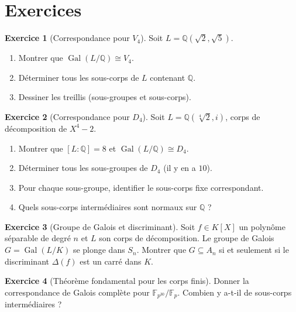\documentclass[12pt,a4paper,openany]{book}
\theoremstyle{definition}
\newtheorem{exercice}{Exercice}[chapter]
\newcommand{\Q}{\mathbb{Q}}
\newcommand{\F}{\mathbb{F}}
\newcommand{\Gal}{\operatorname{Gal}}
\begin{document}
\section{Exercices}\label{sec:exercices-chap12}

\begin{exercice}[Correspondance pour $V_4$]\label{exo:correspondance-V4}
Soit $L = \Q(\sqrt{2},\sqrt{5})$.
\begin{enumerate}[label=(\alph*)]
  \item Montrer que $\Gal(L/\Q) \cong V_4$.
  \item Déterminer tous les sous-corps de $L$ contenant $\Q$.
  \item Dessiner les treillis (sous-groupes et sous-corps).
\end{enumerate}
\end{exercice}

\begin{exercice}[Correspondance pour $D_4$]\label{exo:correspondance-D4}
Soit $L = \Q(\sqrt[4]{2}, i)$, corps de décomposition de $X^4 - 2$.
\begin{enumerate}[label=(\alph*)]
  \item Montrer que $[L:\Q] = 8$ et $\Gal(L/\Q) \cong D_4$.
  \item Déterminer tous les sous-groupes de $D_4$ (il y en a $10$).
  \item Pour chaque sous-groupe, identifier le sous-corps fixe correspondant.
  \item Quels sous-corps intermédiaires sont normaux sur $\Q$ ?
\end{enumerate}
\end{exercice}

\begin{exercice}[Groupe de Galois et discriminant]\label{exo:galois-discriminant}
Soit $f \in K[X]$ un polynôme séparable de degré $n$ et $L$ son corps de
décomposition. Le groupe de Galois $G = \Gal(L/K)$ se plonge dans $S_n$.
Montrer que $G \subseteq A_n$ si et seulement si le discriminant
$\Delta(f)$ est un carré dans $K$.
\end{exercice}

\begin{exercice}[Théorème fondamental pour les corps finis]\label{exo:FTGT-corps-finis}
Donner la correspondance de Galois complète pour $\F_{p^{30}}/\F_p$.
Combien y a-t-il de sous-corps intermédiaires ?
\end{exercice}
\end{document}
